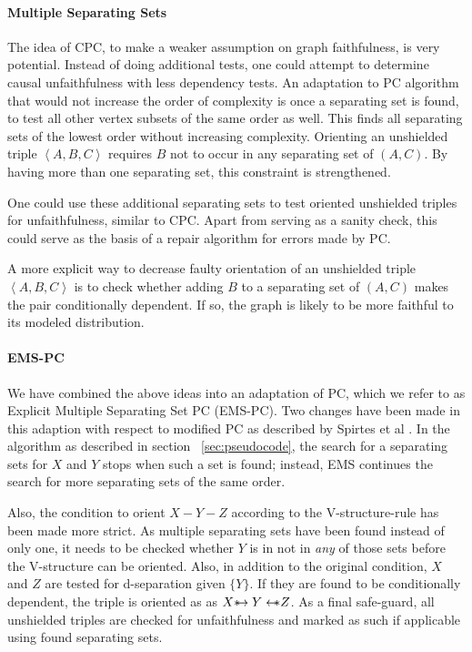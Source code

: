 \documentclass[a4paper, 10pt, english, onecolumn]{article}
\def \srightarrow {\text{\textasteriskcentered}\hspace{-0.62em}\rightarrow}
\def \sleftarrow {\leftarrow\hspace{-0.62em}\text{\textasteriskcentered}}
\begin{document}
\paragraph{Multiple Separating Sets}
The idea of CPC, to make a weaker assumption on graph faithfulness, is very potential.
Instead of doing additional tests, one could attempt to determine causal unfaithfulness with less dependency tests.
An adaptation to PC algorithm that would not increase the order of complexity is once a separating set is found, to test all other vertex subsets of the same order as well.
This finds all separating sets of the lowest order without increasing complexity.
Orienting an unshielded triple $\left<A,B,C\right>$ requires $B$ not to occur in any separating set of $(A,C)$.
By having more than one separating set, this constraint is strengthened.

One could use these additional separating sets to test oriented unshielded triples for unfaithfulness, similar to CPC.
Apart from serving as a sanity check, this could serve as the basis of a repair algorithm for errors made by PC.

A more explicit way to decrease faulty orientation of an unshielded triple $\left<A,B,C\right>$ is to check whether adding $B$ to a separating set of $(A,C)$ makes the pair conditionally dependent.
If so, the graph is likely to be more faithful to its modeled distribution.

\paragraph{EMS-PC}
We have combined the above ideas into an adaptation of PC, which we refer to as Explicit Multiple Separating Set PC (EMS-PC).
Two changes have been made in this adaption with respect to modified PC as described by Spirtes et al \cite{spirtes2000}.
In the algorithm as described in section ~\ref{sec:pseudocode}, the search for a separating sets for $X$ and $Y$ stops when such a set is found; instead, EMS continues the search for more separating sets of the same order.

Also, the condition to orient $X - Y - Z$ according to the V-structure-rule has been made more strict.
As multiple separating sets have been found instead of only one, it needs to be checked whether $Y$ is in not in \emph{any} of those sets before the V-structure can be oriented.
Also, in addition to the original condition, $X$ and $Z$ are tested for d-separation given $\{Y\}$.
If they are found to be conditionally dependent, the triple is oriented as as $X \srightarrow Y \sleftarrow Z$.
As a final safe-guard, all unshielded triples are checked for unfaithfulness and marked as such if applicable using found separating sets. %
\end{document}
